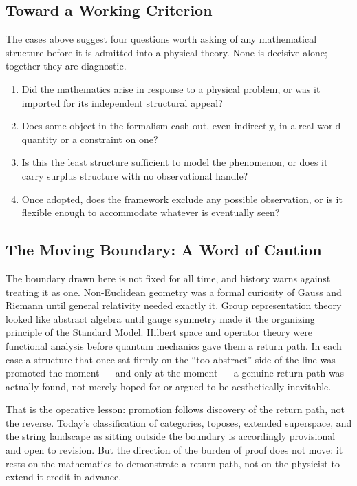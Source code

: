 \subsection{Toward a Working Criterion}

The cases above suggest four questions worth asking of any mathematical
structure before it is admitted into a physical theory. None is decisive alone;
together they are diagnostic.

\begin{enumerate}
  \item[\textbf{Genesis.}] Did the mathematics arise in response to a physical
      problem, or was it imported for its independent structural appeal?
  \item[\textbf{Return path.}] Does some object in the formalism cash out, even
      indirectly, in a real-world quantity or a constraint on one?
  \item[\textbf{Minimality.}] Is this the least structure sufficient to model
      the phenomenon, or does it carry surplus structure with no observational
        handle?
  \item[\textbf{Falsifiability.}] Once adopted, does the framework exclude any
      possible observation, or is it flexible enough to accommodate whatever is
        eventually seen?
\end{enumerate}

\subsection{The Moving Boundary: A Word of Caution}

The boundary drawn here is not fixed for all time, and history warns against
treating it as one. Non-Euclidean geometry was a formal curiosity of Gauss and
Riemann until general relativity needed exactly it. Group representation theory
looked like abstract algebra until gauge symmetry made it the organizing
principle of the Standard Model. Hilbert space and operator theory were
functional analysis before quantum mechanics gave them a return path. In each
case a structure that once sat firmly on the ``too abstract'' side of the line
was promoted the moment --- and only at the moment --- a genuine return path
was actually found, not merely hoped for or argued to be aesthetically
inevitable.

That is the operative lesson: promotion follows discovery of the return path,
not the reverse. Today's classification of categories, toposes, extended
superspace, and the string landscape as sitting outside the boundary is
accordingly provisional and open to revision. But the direction of the burden
of proof does not move: it rests on the mathematics to demonstrate a return
path, not on the physicist to extend it credit in advance.

